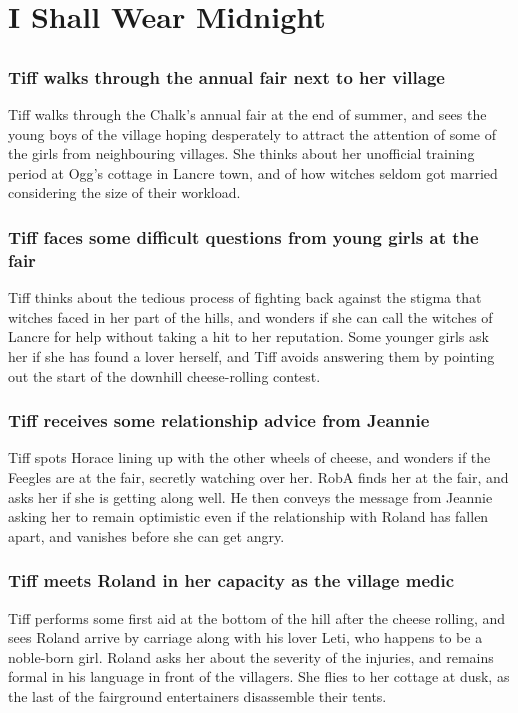 \section{I Shall Wear Midnight}


\subsection{}
\subsubsection{\Gls{Tiff} walks through the annual fair next to her village}
\Gls{Tiff} walks through the Chalk's annual fair at the end of summer, and sees the young boys of
the village hoping desperately to attract the attention of some of the girls from neighbouring
villages. She thinks about her unofficial training period at \Gls{Ogg}'s cottage in Lancre town,
and of how witches seldom got married considering the size of their workload.

\subsubsection{\Gls{Tiff} faces some difficult questions from young girls at the fair}
\Gls{Tiff} thinks about the tedious process of fighting back against the stigma that witches
faced in her part of the hills, and wonders if she can call the witches of Lancre for help without
taking a hit to her reputation. Some younger girls ask her if she has found a lover herself, and
\Gls{Tiff} avoids answering them by pointing out the start of the downhill cheese-rolling
contest.

\subsubsection{\Gls{Tiff} receives some relationship advice from \Gls{Jeannie}}
\Gls{Tiff} spots \Gls{Horace} lining up with the other wheels of cheese, and wonders if the Feegles
are at the fair, secretly watching over her. \Gls{RobA} finds her at the fair, and asks her if she
is getting along well. He then conveys the message from \Gls{Jeannie} asking her to remain
optimistic even if the relationship with \Gls{Roland} has fallen apart, and vanishes before she can
get angry.

\subsubsection{\Gls{Tiff} meets \Gls{Roland} in her capacity as the village medic}
\Gls{Tiff} performs some first aid at the bottom of the hill after the cheese rolling, and sees
\Gls{Roland} arrive by carriage along with his lover \Gls{Leti}, who happens to be a noble-born
girl. \Gls{Roland} asks her about the severity of the injuries, and remains formal in his language
in front of the villagers. She flies to her cottage at dusk, as the last of the fairground
entertainers disassemble their tents.

